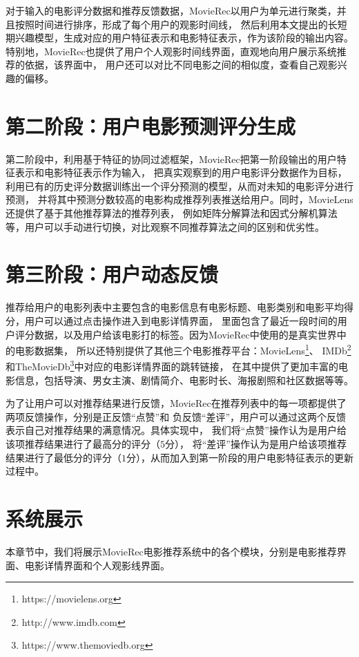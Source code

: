 对于输入的电影评分数据和推荐反馈数据，MovieRec以用户为单元进行聚类，并且按照时间进行排序，形成了每个用户的观影时间线，
然后利用本文提出的长短期兴趣模型，生成对应的用户特征表示和电影特征表示，作为该阶段的输出内容。
特别地，MovieRec也提供了用户个人观影时间线界面，直观地向用户展示系统推荐的依据，该界面中，
用户还可以对比不同电影之间的相似度，查看自己观影兴趣的偏移。

\section{第二阶段：用户电影预测评分生成}
第二阶段中，利用基于特征的协同过滤框架，MovieRec把第一阶段输出的用户特征表示和电影特征表示作为输入，
把真实观察到的用户电影评分数据作为目标，利用已有的历史评分数据训练出一个评分预测的模型，从而对未知的电影评分进行预测，
并将其中预测分数较高的电影构成推荐列表推送给用户。同时，MovieLens还提供了基于其他推荐算法的推荐列表，
例如矩阵分解算法和因式分解机算法等，用户可以手动进行切换，对比观察不同推荐算法之间的区别和优劣性。

\section{第三阶段：用户动态反馈}
推荐给用户的电影列表中主要包含的电影信息有电影标题、电影类别和电影平均得分，用户可以通过点击操作进入到电影详情界面，
里面包含了最近一段时间的用户评分数据，以及用户给该电影打的标签。因为MovieRec中使用的是真实世界中的电影数据集，
所以还特别提供了其他三个电影推荐平台：MovieLens\footnote{https://movielens.org}、
IMDb\footnote{http://www.imdb.com}和TheMovieDb\footnote{https://www.themoviedb.org}中对应的电影详情界面的跳转链接，
在其中提供了更加丰富的电影信息，包括导演、男女主演、剧情简介、电影时长、海报剧照和社区数据等等。

为了让用户可以对推荐结果进行反馈，MovieRec在推荐列表中的每一项都提供了两项反馈操作，分别是正反馈``点赞''和
负反馈``差评''，用户可以通过这两个反馈表示自己对推荐结果的满意情况。具体实现中，
我们将``点赞''操作认为是用户给该项推荐结果进行了最高分的评分（$5$分），
将``差评''操作认为是用户给该项推荐结果进行了最低分的评分（$1$分），从而加入到第一阶段的用户电影特征表示的更新过程中。

\section{系统展示}
本章节中，我们将展示MovieRec电影推荐系统中的各个模块，分别是电影推荐界面、电影详情界面和个人观影线界面。

